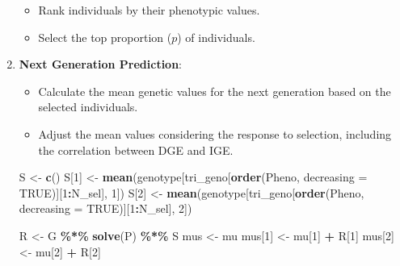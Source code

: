 \documentclass[
]{article}
\newenvironment{Shaded}{\begin{snugshade}}{\end{snugshade}}
\newcommand{\AttributeTok}[1]{\textcolor[rgb]{0.13,0.29,0.53}{#1}}
\newcommand{\ConstantTok}[1]{\textcolor[rgb]{0.56,0.35,0.01}{#1}}
\newcommand{\DecValTok}[1]{\textcolor[rgb]{0.00,0.00,0.81}{#1}}
\newcommand{\FunctionTok}[1]{\textcolor[rgb]{0.13,0.29,0.53}{\textbf{#1}}}
\newcommand{\NormalTok}[1]{#1}
\newcommand{\OtherTok}[1]{\textcolor[rgb]{0.56,0.35,0.01}{#1}}
\newcommand{\SpecialCharTok}[1]{\textcolor[rgb]{0.81,0.36,0.00}{\textbf{#1}}}
\providecommand{\tightlist}{%
  \setlength{\itemsep}{0pt}\setlength{\parskip}{0pt}}
\begin{document}
\begin{enumerate}
  \begin{itemize}
  \tightlist
  \item
    Rank individuals by their phenotypic values.
  \item
    Select the top proportion (\(p\)) of individuals.
  \end{itemize}

\begin{Shaded}
\end{Shaded}
\item
  \textbf{Next Generation Prediction}:

  \begin{itemize}
  \tightlist
  \item
    Calculate the mean genetic values for the next generation based on
    the selected individuals.
  \item
    Adjust the mean values considering the response to selection,
    including the correlation between DGE and IGE.
  \end{itemize}

\begin{Shaded}
\begin{Highlighting}[]
\NormalTok{S }\OtherTok{\textless{}{-}} \FunctionTok{c}\NormalTok{()}
\NormalTok{S[}\DecValTok{1}\NormalTok{] }\OtherTok{\textless{}{-}} \FunctionTok{mean}\NormalTok{(genotype[tri\_geno[}\FunctionTok{order}\NormalTok{(Pheno, }\AttributeTok{decreasing =} \ConstantTok{TRUE}\NormalTok{)][}\DecValTok{1}\SpecialCharTok{:}\NormalTok{N\_sel], }\DecValTok{1}\NormalTok{])}
\NormalTok{S[}\DecValTok{2}\NormalTok{] }\OtherTok{\textless{}{-}} \FunctionTok{mean}\NormalTok{(genotype[tri\_geno[}\FunctionTok{order}\NormalTok{(Pheno, }\AttributeTok{decreasing =} \ConstantTok{TRUE}\NormalTok{)][}\DecValTok{1}\SpecialCharTok{:}\NormalTok{N\_sel], }\DecValTok{2}\NormalTok{])}

\NormalTok{R }\OtherTok{\textless{}{-}}\NormalTok{ G }\SpecialCharTok{\%*\%} \FunctionTok{solve}\NormalTok{(P) }\SpecialCharTok{\%*\%}\NormalTok{ S}
\NormalTok{mus }\OtherTok{\textless{}{-}}\NormalTok{ mu}
\NormalTok{mus[}\DecValTok{1}\NormalTok{] }\OtherTok{\textless{}{-}}\NormalTok{ mu[}\DecValTok{1}\NormalTok{] }\SpecialCharTok{+}\NormalTok{ R[}\DecValTok{1}\NormalTok{]}
\NormalTok{mus[}\DecValTok{2}\NormalTok{] }\OtherTok{\textless{}{-}}\NormalTok{ mu[}\DecValTok{2}\NormalTok{] }\SpecialCharTok{+}\NormalTok{ R[}\DecValTok{2}\NormalTok{]}


\end{Highlighting}
\end{Shaded}
\end{enumerate}
\end{document}
